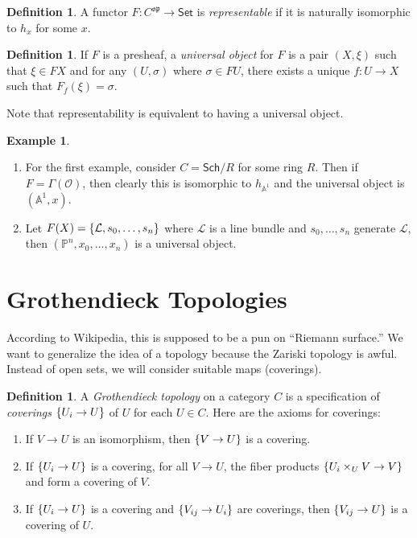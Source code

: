 \documentclass[leqno, openany]{memoir}
\theoremstyle{definition}
\newtheorem{defn}[thm]{Definition}
\newtheorem{exm}[thm]{Example}
\theoremstyle{remark}
\theoremstyle{plain}
\theoremstyle{definition}
\theoremstyle{remark}
\newcommand{\A}{\mathbb{A}}
\renewcommand{\P}{\mathbb{P}}
\newcommand{\mc}[1]{\mathcal{#1}}
\newcommand{\mf}[1]{\mathfrak{#1}}
\newcommand{\ms}[1]{\mathsf{#1}}
\begin{document}
\begin{defn} A functor $F \colon C^{\mf{op}} \to \ms{Set}$ is
\textit{representable} if it is naturally isomorphic to $h_x$ for some $x$.
\end{defn}

\begin{defn} If $F$ is a presheaf, a \textit{universal object} for $F$ is a
pair $(X, \xi)$ such that $\xi \in FX$ and for any $(U, \sigma)$ where $\sigma
\in FU$, there exists a unique $f \colon U \to X$ such that $F_f(\xi) =
\sigma$.  \end{defn}

Note that representability is equivalent to having a universal object.

\begin{exm} \begin{enumerate} \item For the first example, consider $C =
    \ms{Sch}/R$ for some ring $R$. Then if $F = \Gamma(\mc{O})$, then clearly
    this is isomorphic to $h_{\A^1}$ and the universal object is $(\A^1, x)$.
\item Let $F(X) = \qty{\mc{L}, s_0, \ldots, s_n}$ where $\mc{L}$ is a line
    bundle and $s_0, \ldots, s_n$ generate $\mc{L}$, then $(\P^n, x_0, \ldots,
    x_n)$ is a universal object.  \end{enumerate} \end{exm}

\section{Grothendieck Topologies}%

According to Wikipedia, this is supposed to be a pun on ``Riemann surface.'' We
want to generalize the idea of a topology because the Zariski topology is
awful. Instead of open sets, we will consider suitable maps (coverings).

\begin{defn} A \textit{Grothendieck topology} on a category $C$ is a
    specification of \textit{coverings} $\qty{U_i \to U}$ of $U$ for each $U
    \in C$. Here are the axioms for coverings: \begin{enumerate} \item If $V
        \to U$ is an isomorphism, then $\qty{V \to U}$ is a covering.  \item If
        $\qty{U_i \to U}$ is a covering, for all $V \to U$, the fiber products
        $\qty{ U_i \times_U V \to V }$ and form a covering of $V$.  \item If
        $\qty{U_i \to U}$ is a covering and $\qty{V_{ij} \to U_i}$ are
        coverings, then $\qty{V_{ij} \to U}$ is a covering of $U$.
\end{enumerate} \end{defn}
\end{document}
